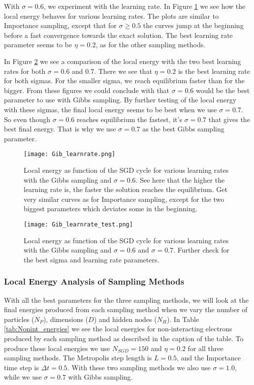 \documentclass[12pt,a4paper,english]{article}
\begin{document}
With $\sigma=0.6$, we experiment with the learning rate. In Figure \ref{fig:check_learnrate_Gib} we see how the local energy behaves for various learning rates. The plots are similar to Importance sampling, except that for $\sigma\geq0.5$ the curves jump at the beginning before a fast convergence towards the exact solution. The best learning rate parameter seems to be $\eta=0.2$, as for the other sampling methods. 

In Figure \ref{fig:check_learnrates_Gib} we see a comparison of the local energy with the two best learning rates for both $\sigma=0.6$ and 0.7. There we see that $\eta=0.2$ is the best learning rate for both sigmas. For the smaller sigma, we reach equilibrium faster than for the bigger. From these figures we could conclude with that $\sigma=0.6$ would be the best parameter to use with Gibbs sampling. By further testing of the local energy with these sigmas, the final local energy seems to be best when we use $\sigma=0.7$. So even though $\sigma=0.6$ reaches equilibrium the fastest, it's $\sigma=0.7$ that gives the best final energy. That is why we use $\sigma=0.7$ as the best Gibbs sampling parameter.

\begin{figure}[htbp!]
	\centering\texttt{[image: Gib\_learnrate.png]}
	\caption{Local energy as function of the SGD cycle for various learning rates with the Gibbs sampling and $\sigma=0.6$. See here that the higher the learning rate is, the faster the solution reaches the equilibrium. Get very similar curves as for Importance sampling, except for the two biggest parameters which deviates some in the beginning. \label{fig:check_learnrate_Gib}}
\end{figure} 

\begin{figure}[htbp!]
	\centering\texttt{[image: Gib\_learnrate\_test.png]}
	\caption{Local energy as function of the SGD cycle for various learning rates with the Gibbs sampling and $\sigma=0.6$ and $\sigma=0.7$. Further check for the best sigma  and learning rate parameters. \label{fig:check_learnrates_Gib}}
\end{figure} 

\subsubsection{Local Energy Analysis of Sampling Methods}
\label{subsubsect:Results_nonint_Analysis}
With all the best parameters for the three sampling methods, we will look at the final energies produced from each sampling method when we vary the number of particles ($N_P$), dimensions ($D$) and hidden nodes ($N_H$). In Table \ref{tab:Nonint_energies} we see the local energies for non-interacting electrons produced by each sampling method as described in the caption of the table. To produce these local energies we use $N_{SGD}=150$ and $\eta=0.2$ for all three sampling methods. The Metropolis step length is $L=0.5$, and the Importance time step is $\Delta t=0.5$. With these two sampling methods we also use $\sigma=1.0$, while we use $\sigma=0.7$ with Gibbs sampling.
\end{document}
